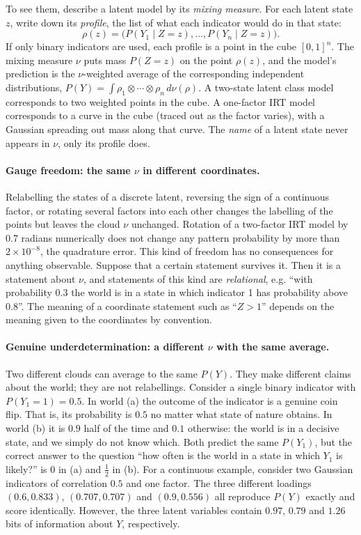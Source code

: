 \begin{draftblock}
To see them, describe a latent model by its \emph{mixing measure}. For each latent state $z$, write down its \emph{profile}, the list of what each indicator would do in that state:
\[
\rho(z)=\big(P(Y_1\mid Z=z),\dots,P(Y_n\mid Z=z)\big).
\]
If only binary indicators are used, each profile is a point in the cube $[0,1]^n$. The mixing measure $\nu$ puts mass $P(Z=z)$ on the point $\rho(z)$, and the model's prediction is the $\nu$-weighted average of the corresponding independent distributions, $P(Y)=\int\rho_1\otimes\cdots\otimes\rho_n\,d\nu(\rho)$. A two-state latent class model corresponds to two weighted points in the cube. A one-factor IRT model corresponds to a curve in the cube (traced out as the factor varies), with a Gaussian spreading out mass along that curve. The \emph{name} of a latent state never appears in $\nu$, only its profile does.

\paragraph{Gauge freedom: the same $\nu$ in different coordinates.} Relabelling the states of a discrete latent, reversing the sign of a continuous factor, or rotating several factors into each other changes the labelling of the points but leaves the cloud $\nu$ unchanged. Rotation of a two-factor IRT model by 0.7 radians numerically does not change any pattern probability by more than $2\times10^{-8}$, the quadrature error. This kind of freedom has no consequences for anything observable. Suppose that a certain statement survives it. Then it is a statement about $\nu$, and statements of this kind are \emph{relational}, e.g. ``with probability 0.3 the world is in a state in which indicator 1 has probability above 0.8''. The meaning of a coordinate statement such as ``$Z>1$'' depends on the meaning given to the coordinates by convention.

\paragraph{Genuine underdetermination: a different $\nu$ with the same average.} Two different clouds can average to the same $P(Y)$. They make different claims about the world; they are not relabellings. Consider a single binary indicator with $P(Y_1=1)=0.5$. In world (a) the outcome of the indicator is a genuine coin flip. That is, its probability is $0.5$ no matter what state of nature obtains. In world (b) it is $0.9$ half of the time and $0.1$ otherwise: the world is in a decisive state, and we simply do not know which. Both predict the same $P(Y_1)$, but the correct answer to the question ``how often is the world in a state in which $Y_1$ is likely?'' is $0$ in (a) and $\tfrac12$ in (b). For a continuous example, consider two Gaussian indicators of correlation $0.5$ and one factor. The three different loadings $(0.6,0.833)$, $(0.707,0.707)$ and $(0.9,0.556)$ all reproduce $P(Y)$ exactly and score identically. However, the three latent variables contain $0.97$, $0.79$ and $1.26$ bits of information about $Y$, respectively.


\end{draftblock}
